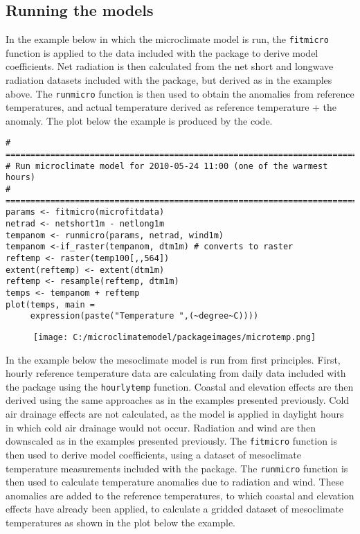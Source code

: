 \documentclass[]{article}
\begin{document}
\subsection{Running the models}\label{running-the-models}

In the example below in which the microclimate model is run, the
\texttt{fitmicro} function is applied to the data included with the
package to derive model coefficients. Net radiation is then calculated
from the net short and longwave radiation datasets included with the
package, but derived as in the examples above. The \texttt{runmicro}
function is then used to obtain the anomalies from reference
temperatures, and actual temperature derived as reference temperature +
the anomaly. The plot below the example is produced by the code.

\begin{verbatim}
# =======================================================================
# Run microclimate model for 2010-05-24 11:00 (one of the warmest hours)
# =======================================================================
params <- fitmicro(microfitdata)
netrad <- netshort1m - netlong1m
tempanom <- runmicro(params, netrad, wind1m)
tempanom <-if_raster(tempanom, dtm1m) # converts to raster
reftemp <- raster(temp100[,,564])
extent(reftemp) <- extent(dtm1m)
reftemp <- resample(reftemp, dtm1m)
temps <- tempanom + reftemp
plot(temps, main =
     expression(paste("Temperature ",(~degree~C))))
\end{verbatim}

\begin{figure}
\centering
\texttt{[image: C:/microclimatemodel/packageimages/microtemp.png]}
\caption{}
\end{figure}

In the example below the mesoclimate model is run from first principles.
First, hourly reference temperature data are calculating from daily data
included with the package using the \texttt{hourlytemp} function.
Coastal and elevation effects are then derived using the same approaches
as in the examples presented previously. Cold air drainage effects are
not calculated, as the model is applied in daylight hours in which cold
air drainage would not occur. Radiation and wind are then downscaled as
in the examples presented previously. The \texttt{fitmicro} function is
then used to derive model coefficients, using a dataset of mesoclimate
temperature measurements included with the package. The
\texttt{runmicro} function is then used to calculate temperature
anomalies due to radiation and wind. These anomalies are added to the
reference temperatures, to which coastal and elevation effects have
already been applied, to calculate a gridded dataset of mesoclimate
temperatures as shown in the plot below the example.
\end{document}
